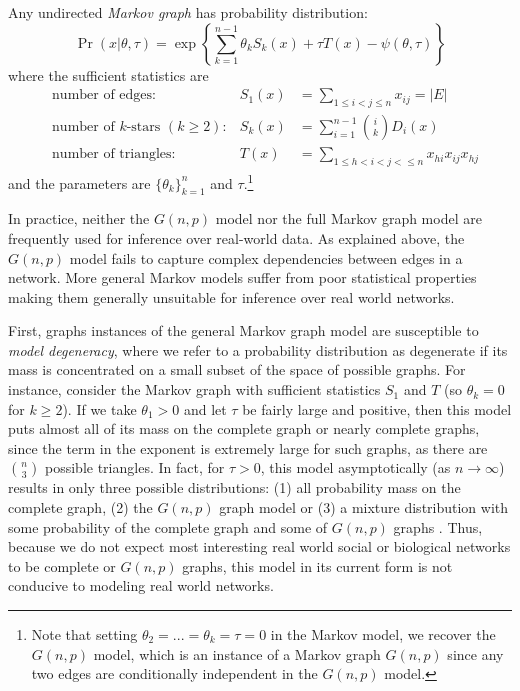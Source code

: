 \begin{example}
\label{ex:markov_graphs}
Any undirected \emph{Markov graph} has probability distribution:
\begin{equation*}
\label{eqn:markov_graph}
\Pr(x | \theta, \tau) = \exp\left\{ \sum_{k = 1}^{n-1} \theta_k S_k(x) + \tau T(x) - \psi(\theta, \tau)   \right\} 
\end{equation*}
where the sufficient statistics are
\begin{align*}
&\text{number of edges:} & S_1(x)  & = \sum_{1 \leq i < j \leq n} x_{ij} = |E|\\
&\text{number of $k$-stars } (k \geq 2): & S_k(x)  & = \sum_{i=1}^{n-1} \binom{i}{k} D_i(x)\\
&\text{number of triangles: } & T(x) & = \sum_{1 \leq h < i < j < \leq n} x_{hi} x_{ij} x_{hj}
\end{align*}
and the parameters are $\{\theta_k\}_{k=1}^{n}$ and $\tau$.\footnote{Note that setting $\theta_2 = ...= \theta_k = \tau = 0$ in the Markov model, we recover the $G(n,p)$ model, which is an instance of a Markov graph $G(n,p)$ since any two edges are conditionally independent in the $G(n,p)$ model.}
\end{example}

In practice, neither the $G(n,p)$ model nor the full Markov graph model are frequently used for inference over real-world data. As explained above, the $G(n,p)$ model fails to capture complex dependencies between edges in a network. More general Markov models suffer from poor statistical properties making them generally unsuitable for inference over real world networks.

First, graphs instances of the general Markov graph model are susceptible to \emph{model degeneracy}, where we refer to a probability distribution as degenerate if its mass is concentrated on a small subset of the space of possible graphs. For instance, consider the Markov graph  with sufficient statistics $S_1$ and $T$ (so $\theta_k = 0$ for $k \geq 2$). If we take $\theta_1 > 0$ and let $\tau$ be fairly large and positive, then this model puts almost all of its mass on the complete graph or nearly complete graphs, since the term in the exponent is extremely large for such graphs, as there are $\binom{n}{3}$ possible triangles. In fact, for $\tau > 0$, this model asymptotically (as $n \to \infty$) results in only three possible distributions: (1) all probability mass on the complete graph, (2) the $G(n,p)$ graph model or (3) a mixture distribution with some probability of the complete graph and some of $G(n,p)$ graphs \cite{Jon99}. Thus, because we do not expect most interesting real world social or biological networks to be complete or $G(n,p)$ graphs, this model in its current form is not conducive to modeling real world networks.

